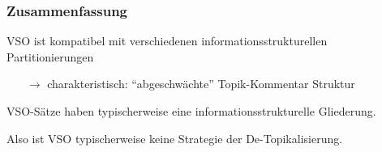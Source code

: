  \begin{frame}
  \frametitle{Zusammenfassung}

VSO ist kompatibel mit verschiedenen informationsstrukturellen Partitionierungen
  \begin{itemize}
  \item[$\rightarrow$] charakteristisch: ``abgeschwächte'' Topik-Kommentar Struktur
 \end{itemize}

\pause
\vspace{.5cm}


\alert{VSO-Sätze haben typischerweise eine informationsstrukturelle Gliederung.}

\vspace{.5cm}

Also ist VSO typischerweise keine Strategie der De-Topikalisierung.

%




 \end{frame}








%
% 
%
%
%
%
%
